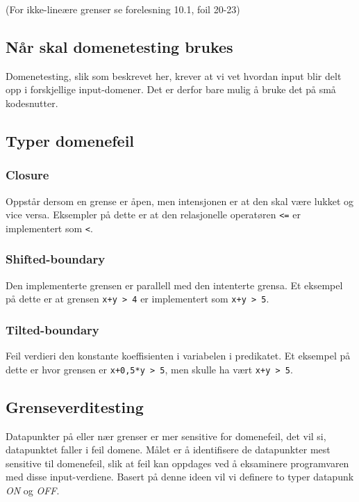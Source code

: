 (For ikke-lineære grenser se forelesning 10.1, foil 20-23)

\subsection{Når skal domenetesting brukes}

Domenetesting, slik som beskrevet her, krever at vi vet hvordan input
blir delt opp i forskjellige input-domener. Det er derfor bare mulig å
bruke det på små kodesnutter.

\subsection{Typer domenefeil}

\subsubsection{Closure}

Oppstår dersom en grense er åpen, men intensjonen er at den skal være
lukket og vice versa. Eksempler på dette er at den relasjonelle
operatøren \texttt{\textless{}=} er implementert som
\texttt{\textless{}}.

\subsubsection{Shifted-boundary}

Den implementerte grensen er parallell med den intenterte grensa. Et
eksempel på dette er at grensen \texttt{x+y \textgreater{} 4} er
implementert som \texttt{x+y \textgreater{} 5}.

\subsubsection{Tilted-boundary}

Feil verdieri den konstante koeffisienten i variabelen i predikatet. Et
eksempel på dette er hvor grensen er \texttt{x+0,5*y \textgreater{} 5},
men skulle ha vært \texttt{x+y \textgreater{} 5}.

\subsection{Grenseverditesting}

Datapunkter på eller nær grenser er mer sensitive for domenefeil, det
vil si, datapunktet faller i feil domene. Målet er å identifisere de
datapunkter mest sensitive til domenefeil, slik at feil kan oppdages ved
å eksaminere programvaren med disse input-verdiene. Basert på denne
ideen vil vi definere to typer datapunk \emph{ON} og \emph{OFF}.

